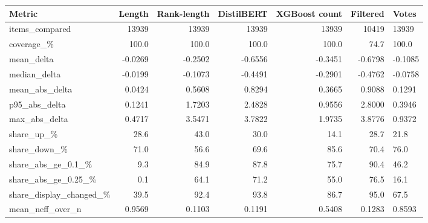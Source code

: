 \begin{tabular}{lrrrrr}
\hline
Metric & Length & Rank-length & DistilBERT & XGBoost count & Filtered & Votes \\
\hline
items\_compared & 13939 & 13939 & 13939 & 13939 & 10419 & 13939 \\
\hline
coverage\_\% & 100.0 & 100.0 & 100.0 & 100.0 & 74.7 & 100.0 \\
\hline
mean\_delta & -0.0269 & -0.2502 & -0.6556 & -0.3451 & -0.6798 & -0.1085 \\
\hline
median\_delta & -0.0199 & -0.1073 & -0.4491 & -0.2901 & -0.4762 & -0.0758 \\
\hline
mean\_abs\_delta & 0.0424 & 0.5608 & 0.8294 & 0.3665 & 0.9088 & 0.1291 \\
\hline
p95\_abs\_delta & 0.1241 & 1.7203 & 2.4828 & 0.9556 & 2.8000 & 0.3946 \\
\hline
max\_abs\_delta & 0.4717 & 3.5471 & 3.7822 & 1.9735 & 3.8776 & 0.9372 \\
\hline
share\_up\_\% & 28.6 & 43.0 & 30.0 & 14.1 & 28.7 & 21.8 \\
\hline
share\_down\_\% & 71.0 & 56.6 & 69.6 & 85.6 & 70.4 & 76.0 \\
\hline
share\_abs\_ge\_0.1\_\% & 9.3 & 84.9 & 87.8 & 75.7 & 90.4 & 46.2 \\
\hline
share\_abs\_ge\_0.25\_\% & 0.1 & 64.1 & 71.2 & 55.0 & 76.5 & 16.1 \\
\hline
share\_display\_changed\_\% & 39.5 & 92.4 & 93.8 & 86.7 & 95.0 & 67.5 \\
\hline
mean\_neff\_over\_n & 0.9569 & 0.1103 & 0.1191 & 0.5408 & 0.1283 & 0.8593 \\
\hline
\end{tabular}
